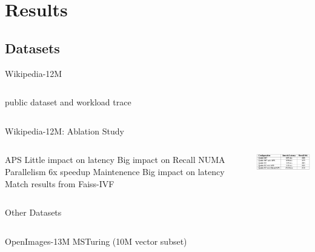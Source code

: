 \section{Results}

\subsection{Datasets}

\begin{frame}{Wikipedia-12M}
\begin{columns}
\centering
\begin{outline}
  \1 public dataset and workload trace
\end{outline}

\begin{center}
\centering

\end{center}
\end{columns}
\end{frame}

\begin{frame}{Wikipedia-12M: Ablation Study}
\begin{columns}
\centering
\begin{outline}
  \1 APS
  \2 Little impact on latency
  \2 Big impact on Recall
  \1 NUMA Parallelism
  \2 6x speedup
  \1 Maintenence
  \2 Big impact on latency
  \2 Match results from Faiss-IVF
\end{outline}

\begin{center}
\centering
\includegraphics[width=5.5cm]{assets/wiki_ablation.png}
\end{center}
\end{columns}
\end{frame}

\begin{frame}{Other Datasets}
\begin{columns}
\centering
\begin{outline}
  \1 OpenImages-13M
  \1 MSTuring (10M vector subset)
\end{outline}

\begin{center}
\centering

\end{center}
\end{columns}
\end{frame}

